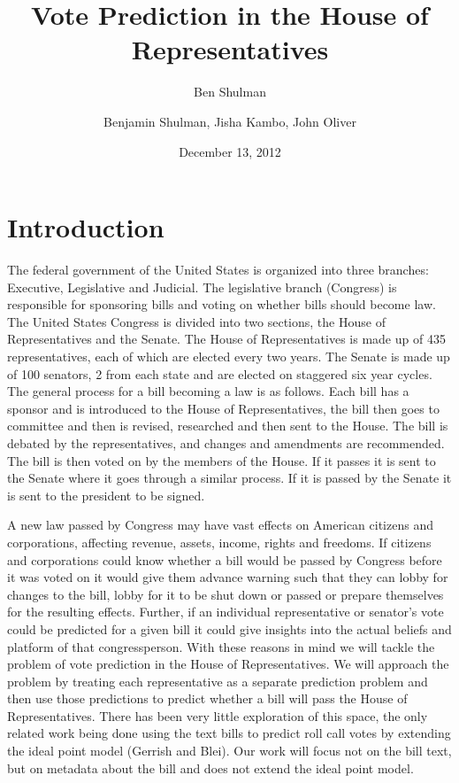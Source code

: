 \documentclass[11pt,letterpaper,twocolumn]{article}
\author{Ben Shulman}
\begin{document}
\title{Vote Prediction in the House of Representatives}
\author{Benjamin Shulman, Jisha Kambo, John Oliver}
\date{December 13, 2012}
\maketitle

\section{Introduction}
The federal government of the United States is organized into three branches: Executive, Legislative and Judicial. The legislative branch (Congress) is responsible for sponsoring bills and voting on whether bills should become law. The United States Congress is divided into two sections, the House of Representatives and the Senate. The House of Representatives is made up of 435 representatives, each of which are elected every two years. The Senate is made up of 100 senators, 2 from each state and are elected on staggered six year cycles. The general process for a bill becoming a law is as follows. Each bill has a sponsor and is introduced to the House of Representatives, the bill then goes to committee and then is revised, researched and then sent to the House. The bill is debated by the representatives, and changes and amendments are recommended. The bill is then voted on by the members of the House. If it passes it is sent to the Senate where it goes through a similar process. If it is passed by the Senate it is sent to the president to be signed.

	A new law passed by Congress may have vast effects on American citizens and corporations, affecting revenue, assets, income, rights and freedoms. If citizens and corporations could know whether a bill would be passed by Congress before it was voted on it would give them advance warning such that they can lobby for changes to the bill, lobby for it to be shut down or passed or prepare themselves for the resulting effects. Further, if an individual representative or senator's vote could be predicted for a given bill it could give insights into the actual beliefs and platform of that congressperson. With these reasons in mind we will tackle the problem of vote prediction in the House of Representatives. We will approach the problem by treating each representative as a separate prediction problem and then use those predictions to predict whether  a bill will pass the House of Representatives. There has been very little exploration of this space, the only related work being done using the text bills to predict roll call votes by extending the ideal point model (Gerrish and Blei). Our work will focus not on the bill text, but on metadata about the bill and does not extend the ideal point model.
\end{document}
